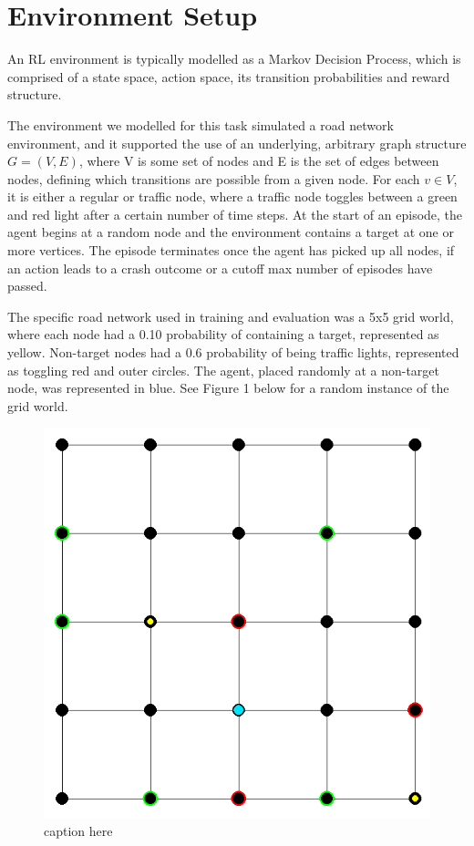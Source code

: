 \documentclass{article}
\begin{document}
	\section{Environment Setup}
	
	An RL environment is typically modelled as a Markov Decision Process, which is comprised of a state space, action space, its transition probabilities and reward structure.
	
	The environment we modelled for this task simulated a road network environment, and it supported the use of an underlying, arbitrary graph structure $G = (V, E)$, where V is some set of nodes and E is the set of edges between nodes, defining which transitions are possible from a given node. For each $v\in V$, it is either a regular or traffic node, where a traffic node toggles between a green and red light after a certain number of time steps. At the start of an episode, the agent begins at a random node and the environment contains a target at one or more vertices. The episode terminates once the agent has picked up all nodes, if an action leads to a crash outcome or a cutoff max number of episodes have passed.
	
	The specific road network used in training and evaluation was a 5x5 grid world, where each node had a 0.10 probability of containing a target, represented as yellow. Non-target nodes had a 0.6 probability of being traffic lights, represented as toggling red and outer circles. The agent, placed randomly at a non-target node, was represented in blue. See Figure 1 below for a random instance of the grid world.
	
	\begin{figure}[hbt!]
		\centering
		\includegraphics[scale=0.5]{grid-world.png}
		\caption{caption here}
		\label{fig:grid-world.png}
	\end{figure}
	\FloatBarrier 
	
\end{document}
